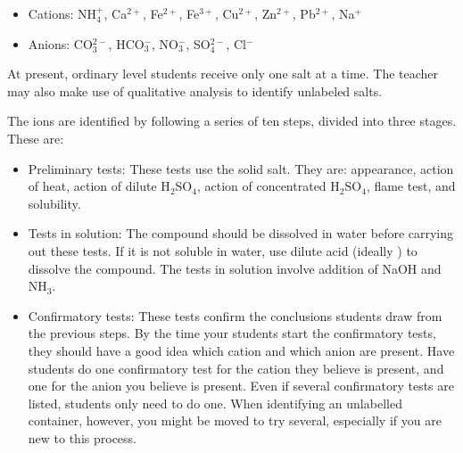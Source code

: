 \begin{itemize}
\item{Cations: NH$_{4}^{+}$, 
Ca$^{2+}$, 
Fe$^{2+}$, 
Fe$^{3+}$, 
Cu$^{2+}$, 
Zn$^{2+}$, 
Pb$^{2+}$, 
Na$^{+}$}
\item{Anions: CO$_{3}^{2-}$, 
HCO$_{3}^{-}$, 
NO$_{3}^{-}$, 
SO$_{4}^{2-}$, 
Cl$^{-}$}
\end{itemize}
At present, 
ordinary level students receive only one salt at a time. The teacher may also make use of qualitative analysis to identify unlabeled salts.

The ions are identified by following a series of ten steps, divided into three stages. These are:
\begin{itemize}
\item{Preliminary tests:
These tests use the solid salt. They are: appearance, action of heat, action of dilute H$_{2}$SO$_{4}$, action of concentrated H$_{2}$SO$_{4}$, flame test, and solubility.}
\item{Tests in solution: The compound should be dissolved in water before carrying out these tests. If it is not soluble in water, use dilute acid (ideally ) to dissolve the compound. The tests in solution involve addition of NaOH and NH$_{3}$.}
\item{Confirmatory tests: These tests confirm the conclusions students draw from the previous steps. By the time your students start the confirmatory tests, they should have a good idea which cation and which anion are present. Have students do one confirmatory test for the cation they believe is present, and one for the anion you believe is present. Even if several confirmatory tests are listed, students only need to do one. When identifying an unlabelled container, however, you might be moved to try several, especially if you are new to this process.}
\end{itemize}


